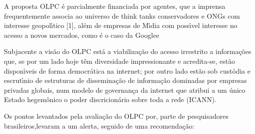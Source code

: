 \documentclass[
12pt,		%
openright,	%
twoside,  %
a4paper,			%
chapter=TITLE,		%
english,			%
french,				%
spanish,			%
brazil				%
]{USPSC-classe/USPSC}
\begin{document}
\begin{alineas}
\item \textquotedbl A proposta OLPC \'e parcialmente financiada por agentes, que a imprensa frequentemente associa ao universo de think tanks conservadores e ONGs com interesse geopol\'{\i}tico [1], al\'em de empresas de M\'{\i}dia com poss\'{\i}vel interesse no acesso a novos mercados, como \'e o caso da Google\textquotedbl  e
\item \textquotedbl Subjacente a vis\~ao do OLPC est\'a a viabiliza\c{c}\~ao do acesso irrestrito a informa\c{c}\~oes que, se por um lado hoje t\^em diversidade impressionante e acredita-se, est\~ao dispon\'{\i}veis de forma democr\'atica na internet; por outro lado est\~ao sob cust\'odia e escrut\'{\i}nio de estruturas de dissemina\c{c}\~ao de informa\c{c}\~ao dominadas por empresas privadas globais, num modelo de governan\c{c}a da internet que atribui a um \'unico Estado hegem\^onico o poder discricion\'ario sobre toda a rede (ICANN)\textquotedbl .
\end{alineas}

Os pontos levantados pela avalia\c{c}\~ao do OLPC por, parte de pesquisadores brasileiros,levaram a um alerta, seguido de uma recomenda\c{c}\~ao:










\noindent\begin{center}\mbox{\centering{}}\end{center}
\end{document}
